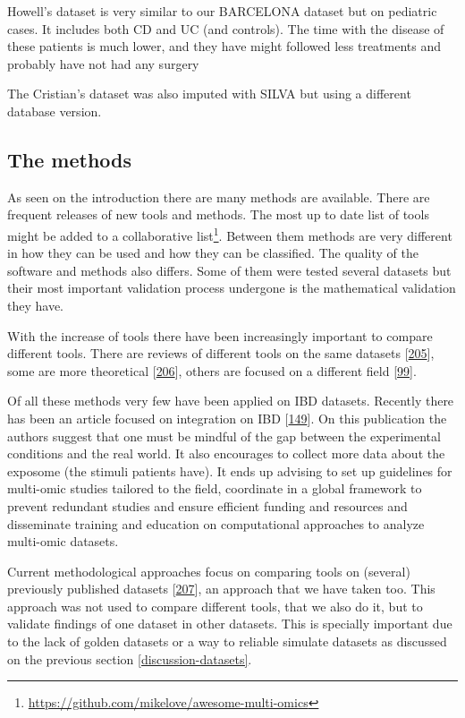 \documentclass[
  a4paper,
]{book}
\DeclareRobustCommand{\href}[2]{#2\footnote{\url{#1}}}
\begin{document}
Howell's dataset is very similar to our BARCELONA dataset but on pediatric cases.
It includes both CD and UC (and controls).
The time with the disease of these patients is much lower, and they have might followed less treatments and probably have not had any surgery

The Cristian's dataset was also imputed with SILVA but using a different database version.

\hypertarget{the-methods}{%
\subsection{The methods}\label{the-methods}}

As seen on the introduction there are many methods are available.
There are frequent releases of new tools and methods.
The most up to date list of tools might be added to a \href{https://github.com/mikelove/awesome-multi-omics}{collaborative list}.
Between them methods are very different in how they can be used and how they can be classified.
The quality of the software and methods also differs.
Some of them were tested several datasets but their most important validation process undergone is the mathematical validation they have.

With the increase of tools there have been increasingly important to compare different tools.
There are reviews of different tools on the same datasets {[}\protect\hyperlink{ref-cantini2020}{205}{]}, some are more theoretical {[}\protect\hyperlink{ref-bersanelli2016}{206}{]}, others are focused on a different field {[}\protect\hyperlink{ref-cavill2016}{99}{]}.

Of all these methods very few have been applied on IBD datasets.
Recently there has been an article focused on integration on IBD {[}\protect\hyperlink{ref-sudhakar2022}{149}{]}.
On this publication the authors suggest that one must be mindful of the gap between the experimental conditions and the real world.
It also encourages to collect more data about the exposome (the stimuli patients have).
It ends up advising to set up guidelines for multi-omic studies tailored to the field, coordinate in a global framework to prevent redundant studies and ensure efficient funding and resources and disseminate training and education on computational approaches to analyze multi-omic datasets.

Current methodological approaches focus on comparing tools on (several) previously published datasets {[}\protect\hyperlink{ref-cantini2021}{207}{]}, an approach that we have taken too.
This approach was not used to compare different tools, that we also do it, but to validate findings of one dataset in other datasets.
This is specially important due to the lack of golden datasets or a way to reliable simulate datasets as discussed on the previous section \ref{discussion-datasets}.
\end{document}

